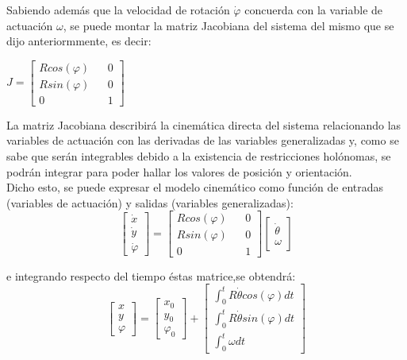 \documentclass[a4paper,twoside]{article}
\begin{document}
	Sabiendo además que la velocidad de rotación $\dot{\varphi}$ concuerda con la variable de actuación $\omega$, se puede montar la matriz Jacobiana del sistema del mismo que se dijo anteriormmente, es decir:
\begin{center}
		$
		J=
		\begin{bmatrix}
			R cos(\varphi) && 0\\
			R sin(\varphi) && 0\\
			0 && 1
		\end{bmatrix}
		$
\end{center}

La matriz Jacobiana describirá la cinemática directa del sistema relacionando las variables de actuación con las derivadas de las variables generalizadas y, como se sabe que serán integrables debido a la existencia de restricciones holónomas, se podrán integrar para poder hallar los valores de posición y orientación.\\

	Dicho esto, se puede expresar el modelo cinemático como función de entradas (variables de actuación) y salidas (variables generalizadas):
	\begin{equation}
		\begin{bmatrix}
		\dot{x}\\
		\dot{y}\\
		\dot{\varphi}
		\end{bmatrix}
		=
		\begin{bmatrix}
		R cos(\varphi) && 0\\
		R sin(\varphi) && 0\\
		0 && 1
		\end{bmatrix}
		\begin{bmatrix}
		\dot{\theta}\\
		\omega
		\end{bmatrix}
	\end{equation}

	e integrando respecto del tiempo éstas matrice,se obtendrá:
		\begin{equation}
		\begin{bmatrix}
		x\\
		y\\
		\varphi
		\end{bmatrix}
		=
		\begin{bmatrix}
		x_0\\
		y_0\\
		\varphi_0
		\end{bmatrix}
		+
		\begin{bmatrix}
		\int_{0}^{t} R\dot{\theta}cos(\varphi)dt\\
		\int_{0}^{t} R\dot{\theta}sin(\varphi)dt\\
		\int_{0}^{t} \omega dt
		\end{bmatrix}
	\end{equation}
\end{document}
